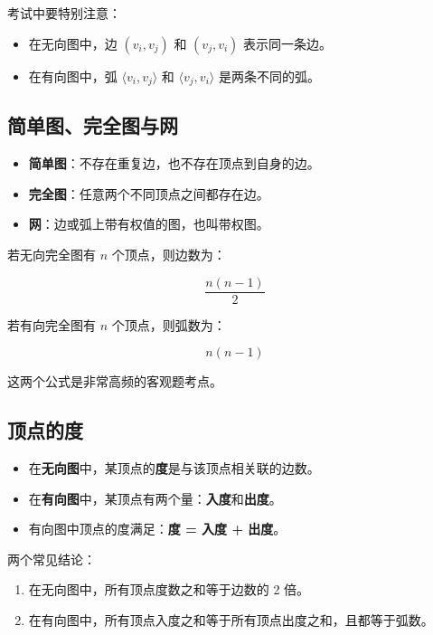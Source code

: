 \documentclass{../../note}
\begin{document}
考试中要特别注意：

\begin{itemize}
  \item 在无向图中，边 $(v_i, v_j)$ 和 $(v_j, v_i)$ 表示同一条边。
  \item 在有向图中，弧 $\langle v_i, v_j \rangle$ 和 $\langle v_j, v_i \rangle$ 是两条不同的弧。
\end{itemize}

\subsection{简单图、完全图与网}

\begin{itemize}
  \item \textbf{简单图}：不存在重复边，也不存在顶点到自身的边。
  \item \textbf{完全图}：任意两个不同顶点之间都存在边。
  \item \textbf{网}：边或弧上带有权值的图，也叫带权图。
\end{itemize}

若无向完全图有 $n$ 个顶点，则边数为：

\[
\frac{n(n-1)}{2}
\]

若有向完全图有 $n$ 个顶点，则弧数为：

\[
n(n-1)
\]

这两个公式是非常高频的客观题考点。

\subsection{顶点的度}

\begin{itemize}
  \item 在\textbf{无向图}中，某顶点的\textbf{度}是与该顶点相关联的边数。
  \item 在\textbf{有向图}中，某顶点有两个量：\textbf{入度}和\textbf{出度}。
  \item 有向图中顶点的度满足：\textbf{度 = 入度 + 出度}。
\end{itemize}

两个常见结论：

\begin{enumerate}
  \item 在无向图中，所有顶点度数之和等于边数的 2 倍。
  \item 在有向图中，所有顶点入度之和等于所有顶点出度之和，且都等于弧数。
\end{enumerate}
\end{document}
